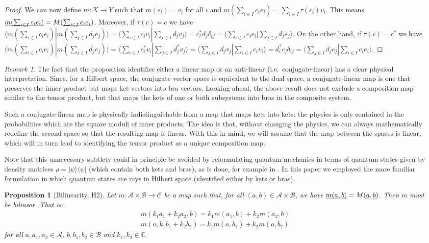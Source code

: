 \documentclass[aps,prl,amsmath,amssymb,twocolumn,nofootinbib]{revtex4}
\theoremstyle{plain}
\newtheorem{prop}[thrm]{Proposition}
\theoremstyle{definition}
\theoremstyle{remark}
\newtheorem*{remark}{Remark}
\newcommand{\pj}[1] {\underbar{$#1$}}
\def\>{\rangle}
\def\<{\langle}
\begin{document}
\begin{proof}
  We can now define $m : X \to Y$ such that $m(e_i) = v_i$ for all $i$ and $m(\sum_{i \in I} c_i e_i) = \sum_{i \in I} \tau(c_i) v_i$. This means $\underbar{$m(\sum_{i \in I} c_i e_i)$} = M(\underbar{$\sum_{i \in I} c_i e_i$})$. Moreover, if $\tau(c) = c$ we have $\<m(\sum_{i \in I} c_i e_i)|m(\sum_{j \in I} d_j e_j)\> = \<\sum_{i \in I} c_i v_i|\sum_{j \in I} d_j v_j\> = c_i^* d_j \delta_{ij} = \<\sum_{i \in I} c_i e_i|\sum_{j \in I} d_j e_j\>$. On the other hand, if $\tau(c) = c^*$ we have $\<m(\sum_{i \in I} c_i e_i)|m(\sum_{j \in I} d_j e_j)\> = \<\sum_{i \in I} c_i^* v_i|\sum_{j \in I} d_j^* v_j\> = \<\sum_{j \in I} d_j v_j|\sum_{i \in I} c_i v_i\> = d_i^* c_j \delta_{ij} = \<\sum_{j \in I} d_j e_j|\sum_{i \in I} c_i e_i\>$.
\end{proof}

\begin{remark}
The fact that the proposition identifies either a linear map or an anti-linear (i.e.~conjugate-linear)  has a clear physical interpretation. Since, for a Hilbert space, the conjugate vector space is equivalent to the dual space, a conjugate-linear map is one that preserves the inner product but maps ket vectors into bra vectors. Looking ahead, the above result does not exclude a composition map similar to the tensor product, but that maps the kets of one or both subsystems into bras in the composite system.

Such a conjugate-linear map is physically indistinguishable from a map that maps kets into kets: the physics is only contained in the probabilities which are the square moduli of inner products. The idea is that, without changing the physics, we can always mathematically redefine the second space so that the resulting map is linear. With this in mind, we will assume that the map between the spaces is linear, which will in turn lead to identifying the tensor product as a unique composition map.

Note that this unnecessary subtlety could in principle be avoided by
reformulating quantum mechanics in terms of quantum states given by
density matrices $\rho=|\psi\>\<\psi|$ (which contain both  kets and
bras), as is done, for example in \cite{ozawa,holevo}. In this paper
we employed the more familiar formulation in which quantum states are
rays in Hilbert space (identified either by kets or bras).
\end{remark}

\begin{prop}[Bilinearity, H2]\label{prop_bilinearity}
  Let $m : \mathcal{A} \times \mathcal{B} \to \mathcal{C}$ be a map such that, for all $(a,b) \in \mathcal{A} \times \mathcal{B}$, we have $\pj{m(a,b)} = M(\pj{a}, \pj{b})$. Then $m$ must be bilinear. That is:
  \begin{align}
m(k_1a_1 + k_2a_2, b)=k_1m(a_1, b) + k_2m(a_2, b) \\
m(a, k_1b_1 + k_2b_2)=k_1m(a, b_1) + k_2m(a, b_2)
\end{align}
for all $a, a_1, a_2 \in \mathcal{A}$, $b, b_1, b_2 \in \mathcal{B}$ and $k_1, k_2 \in \mathbb{C}$.
\end{prop}
\end{document}
